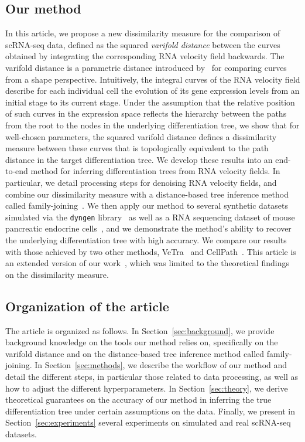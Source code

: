 \documentclass[pdflatex,sn-mathphys-num]{sn-jnl}%
\theoremstyle{thmstyleone}%
\theoremstyle{thmstyletwo}%
\theoremstyle{thmstylethree}%
\begin{document}
\subsection{Our method}
In this article, we propose a new dissimilarity measure for the comparison of scRNA-seq data, defined as the squared \textit{varifold distance} between the curves obtained by integrating the corresponding RNA velocity field backwards. The varifold distance is a parametric distance introduced by~\citeauthor{kaltenmark_general_2017} for comparing curves from a shape perspective. Intuitively, the integral curves of the RNA velocity field describe for each individual cell the evolution of its gene expression levels from an initial stage to its current stage. Under the assumption that the relative position of such curves in the expression space reflects the hierarchy between the paths from the root to the nodes in the underlying differentiation tree, we show that for well-chosen parameters, the squared varifold distance defines a dissimilarity measure between these curves that is topologically equivalent to the path distance in the target differentiation tree. We develop these results into an end-to-end method for inferring differentiation trees from RNA velocity fields. In particular, we detail processing steps for denoising RNA velocity fields, and combine our dissimilarity measure with a distance-based tree inference method called family-joining~\cite{kalaghatgi_family_2016}. We then apply our method to several synthetic datasets simulated via the \texttt{dyngen} library~\cite{robrecht_dyngen_2021} as well as a RNA sequencing dataset of mouse pancreatic endocrine cells~\cite{bastidasponce_comprehensive_2019}, and we demonstrate the method's ability to recover the underlying differentiation tree with high accuracy. We compare our results with those achieved by two other methods, VeTra~\cite{weng_vetra_2021} and CellPath~\cite{zhang_cellpath_2021}. This article is an extended version of our work~\cite{maignant_tree_2025}, which was limited to the theoretical findings on the dissimilarity measure.

\subsection{Organization of the article}
The article is organized as follows. In Section~\ref{sec:background}, we provide background knowledge on the tools our method relies on, specifically on the varifold distance and on the distance-based tree inference method called family-joining. In Section~\ref{sec:methods}, we describe the workflow of our method and detail the different steps, in particular those related to data processing, as well as how to adjust the different hyperparameters. In Section~\ref{sec:theory}, we derive theoretical guarantees on the accuracy of our method in inferring the true differentiation tree under certain assumptions on the data. Finally, we present in Section~\ref{sec:experiments} several experiments on simulated and real scRNA-seq datasets. 
\end{document}
